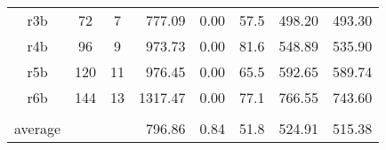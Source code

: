 \begin{landscape}
\begin{table}[]
\begin{tabular}{ccclllll}
r3b     & 72                  &7                   & \multicolumn{1}{r}{777.09}    & \multicolumn{1}{r}{0.00}     & \multicolumn{1}{r}{57.5}   & \multicolumn{1}{r}{498.20}    & \multicolumn{1}{r}{493.30}     \\
r4b     & 96                 & 9                   & \multicolumn{1}{r}{973.73}    & \multicolumn{1}{r}{0.00}     & \multicolumn{1}{r}{81.6}   & \multicolumn{1}{r}{548.89}    & \multicolumn{1}{r}{535.90}     \\
r5b     & 120                 & 11                   & \multicolumn{1}{r}{976.45}    & \multicolumn{1}{r}{0.00}     & \multicolumn{1}{r}{65.5}   & \multicolumn{1}{r}{592.65}    & \multicolumn{1}{r}{589.74}     \\
r6b     & 144               & 13                   & \multicolumn{1}{r}{1317.47}    & \multicolumn{1}{r}{0.00}     & \multicolumn{1}{r}{77.1}   & \multicolumn{1}{r}{766.55}    & \multicolumn{1}{r}{743.60}     \\
        & \multicolumn{1}{l}{} & \multicolumn{1}{l}{} &                          &                           &                         &                          &                           \\
average & \multicolumn{1}{c}{} & \multicolumn{1}{l}{} &\multicolumn{1}{r}{796.86}   &     \multicolumn{1}{r}{0.84}                        &  \multicolumn{1}{r}{51.8}                        &       \multicolumn{1}{r}{524.91}                    &       \multicolumn{1}{r}{515.38}                     \\ \hline
\end{tabular}
\end{table}
\end{landscape}


